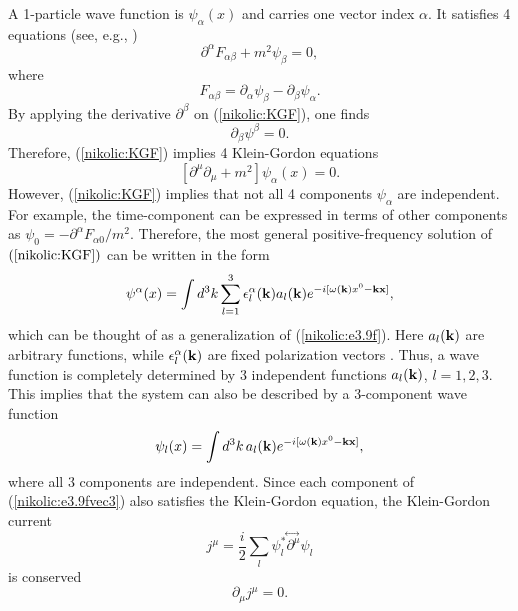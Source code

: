 \documentclass[12pt,twoside]{report} %
\begin{document}
A 1-particle wave function is $\psi_{\alpha}(x)$ and carries one vector index ${\alpha}$.
It satisfies 4 equations (see, e.g., \cite{ryder})
\begin{equation}\label{nikolic:KGF}
\partial^{\alpha}F_{\alpha\beta}+m^2\psi_{\beta}=0 ,
\end{equation} 
where
\begin{equation}\label{nikolic:F}
F_{\alpha\beta}=\partial_{\alpha}\psi_{\beta}-\partial_{\beta}\psi_{\alpha} .
\end{equation}
By applying the derivative $\partial^{\beta}$ on (\ref{nikolic:KGF}), one finds
\begin{equation}\label{nikolic:Lorgauge}
 \partial_{\beta}\psi^{\beta}=0 .
\end{equation}
Therefore, (\ref{nikolic:KGF}) implies 4 Klein-Gordon equations
\begin{equation}\label{nikolic:KGs1p}
 [\partial^{\mu}\partial_{\mu}+m^2]\psi_{\alpha}(x) =0 .
\end{equation} 
However, (\ref{nikolic:KGF}) implies that not all 4 components $\psi_{\alpha}$ 
are independent. For example, the time-component can be expressed in terms of other
components as $\psi_0=-\partial^{\alpha}F_{\alpha 0}/m^2$. Therefore, the most
general positive-frequency solution of $(\ref{nikolic:KGF})$ can be written in the form
\begin{equation}\label{nikolic:e3.9fvec}
\psi^{\alpha}(x)=\int d^3k \sum_{l=1}^{3} \epsilon^{\alpha}_l({\bf k}) a_l({\bf k})
e^{-i[\omega({\bf k})x^0-{\bf k}{\bf x}]} , 
\end{equation}
which can be thought of as a generalization of (\ref{nikolic:e3.9f}).
Here $a_l({\bf k})$ are arbitrary functions, while $\epsilon^{\alpha}_l({\bf k})$
are fixed polarization vectors \cite{ryder}. Thus, a wave function is completely
determined by 3 independent functions $a_l({\bf k})$, $l=1,2,3$. 
This implies that the system can also be described by a 3-component wave function
\begin{equation}\label{nikolic:e3.9fvec3}
\psi_l(x)=\int d^3k \, a_l({\bf k})
e^{-i[\omega({\bf k})x^0-{\bf k}{\bf x}]} , 
\end{equation}
where all 3 components are independent.
Since each component of (\ref{nikolic:e3.9fvec3}) also satisfies the Klein-Gordon
equation, the Klein-Gordon current
\begin{equation}\label{nikolic:curs1p}
j^{\mu}=\frac{i}{2} \sum_l 
\psi^*_l \!\stackrel{\leftrightarrow\;}{\partial^{\mu}}\! \psi_l 
\end{equation}
is conserved
\begin{equation}\label{nikolic:curs1pcons}
 \partial_{\mu}j^{\mu}=0 .
\end{equation}
 
\end{document}
